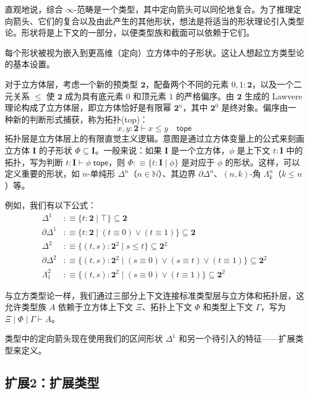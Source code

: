 \documentclass[12pt,a4paper]{article}
\theoremstyle{definition}
\theoremstyle{definition}
\begin{document}
直观地说，综合 $\infty$-范畴是一个类型，其中定向箭头可以同伦地复合。为了推理定向箭头、它们的复合以及由此产生的其他形状，想法是将适当的形状理论引入类型论。形状将是上下文的一部分，以便类型族和截面可以依赖于它们。

每个形状被视为嵌入到更高维（定向）立方体中的子形状。这让人想起立方类型论的基本设置。

对于立方体层，考虑一个新的预类型 $\mathbf{2}$，配备两个不同的元素 $0,1:\mathbf{2}$，以及一个二元关系 $\leq$ 使 $\mathbf{2}$ 成为具有底元素 $0$ 和顶元素 $1$ 的严格偏序。由 $\mathbf{2}$ 生成的 Lawvere 理论构成了立方体层，即立方体恰好是有限幂 $\mathbf{2}^n$，其中 $\mathbf{2}^0$ 是终对象。偏序由一种新的判断形式捕获，称为拓扑(top)：
\[
x,y:\mathbf{2} \vdash x \leq y \quad \mathsf{tope}
\]
拓扑层是立方体层上的有限直觉主义逻辑。意图是通过立方体变量上的公式来刻画立方体 $\mathbf{I}$ 的子形状 $\Phi \subseteq \mathbf{I}$。一般来说：如果 $\mathbf{I}$ 是一个立方体，$\phi$ 是上下文 $t:\mathbf{I}$ 中的拓扑，写为判断 $t:\mathbf{I} \vdash \phi \; \mathsf{tope}$，则 $\Phi :\equiv \{t:\mathbf{I} \mid \phi\}$ 是对应于 $\phi$ 的形状。这样，可以定义重要的形状，如 $n$-单纯形 $\Delta^n$（$n \in \mathbb{N}$）、其边界 $\partial\Delta^n$、$(n,k)$-角 $\Lambda^n_k$（$k \leq n$）等。

例如，我们有以下公式：
\begin{align*}
\Delta^1 &:\equiv \{t:\mathbf{2} \mid \top\} \subseteq \mathbf{2} \\
\partial\Delta^1 &:\equiv \{t:\mathbf{2} \mid (t \equiv 0) \lor (t \equiv 1)\} \subseteq \mathbf{2} \\
\Delta^2 &:\equiv \{(t,s):\mathbf{2}^2 \mid s \leq t\} \subseteq \mathbf{2}^2 \\
\partial\Delta^2 &:\equiv \{(t,s):\mathbf{2}^2 \mid (s \equiv 0) \lor (s \equiv t) \lor (t \equiv 1)\} \subseteq \mathbf{2}^2 \\
\Lambda^2_1 &:\equiv \{(t,s):\mathbf{2}^2 \mid (s \equiv 0) \lor (t \equiv 1)\} \subseteq \mathbf{2}^2
\end{align*}

与立方类型论一样，我们通过三部分上下文连接标准类型层与立方体和拓扑层，这允许类型族 $A$ 依赖于立方体上下文 $\Xi$、拓扑上下文 $\Phi$ 和类型上下文 $\Gamma$，写为 $\Xi \mid \Phi \mid \Gamma \vdash A$。

类型中的定向箭头现在使用我们的区间形状 $\Delta^1$ 和另一个待引入的特征——扩展类型来定义。

\subsection{扩展2：扩展类型}
\end{document}
